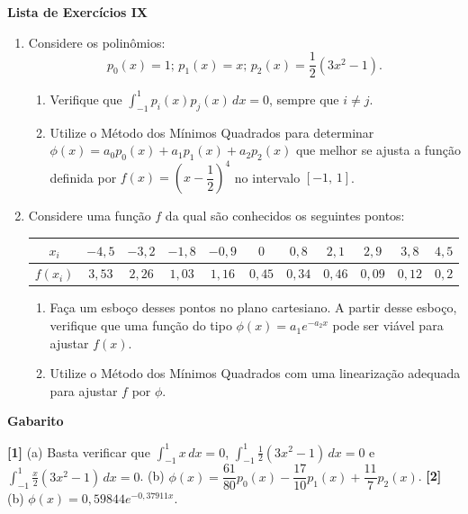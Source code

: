 \documentclass[12pt,a4paper]{article}
\begin{document}
\begin{center}
 \textbf{Lista de Exercícios IX}
\end{center}

\begin{enumerate}
  
  \item Considere os polinômios:
$$p_0(x) = 1;\, p_1(x) = x;\,p_2(x) = \frac{1}{2}(3x^2 - 1).$$


   \begin{enumerate}
    \item Verifique que $\displaystyle\int_{-1}^1 p_i(x)p_j(x)\,dx = 0$, sempre que $i\neq j$.
    \item Utilize o Método dos Mínimos Quadrados para determinar $\phi(x) = a_0p_0(x) + a_1p_1(x) + a_2p_2(x)$ que melhor se ajusta a função definida por 
          $f(x) = \left(x - \dfrac{1}{2}\right)^4$ no intervalo $[-1,\, 1]$.
   \end{enumerate}


  \item Considere uma função $f$ da qual são conhecidos os seguintes pontos:

   \begin{center}
   \begin{tabular}{c|c|c|c|c|c|c|c|c|c|c}
      $x_i$ & $-4,5$ & $-3,2$ & $-1,8$ & $-0,9$ & $0$ & $0,8$ & $2,1$ & $2,9$ & $3,8$ & $4,5$\\ \hline
      $f(x_i)$ & $3,53$ & $2,26$ & $1,03$ & $1,16$ & $0,45$ & $0,34$ & $0,46$ & $0,09$ & $0,12$ & $0,2$
   \end{tabular}
   \end{center}

   \begin{enumerate}
    \item Faça um esboço desses pontos no plano cartesiano. A partir desse esboço, verifique que uma função do tipo $\phi(x) = a_1e^{-a_2x}$ pode ser 
viável para ajustar $f(x)$.
    \item Utilize o Método dos Mínimos Quadrados com uma linearização adequada para ajustar $f$ por $\phi$.
   \end{enumerate}
  
\end{enumerate}

\begin{center}
\textbf{Gabarito}
\end{center} 
\textbf{[1]} (a) Basta verificar que $\displaystyle\int_{-1}^1 x\,dx=0$, $\displaystyle\int_{-1}^1 \frac{1}{2}(3x^2 - 1)\,dx=0$ e 
$\displaystyle\int_{-1}^1 \frac{x}{2}(3x^2 - 1)\,dx=0$. (b) $\phi(x) = \dfrac{61}{80}p_0(x) - \dfrac{17}{10}p_1(x) + \dfrac{11}{7}p_2(x)$. 
\textbf{[2]} (b) $\phi(x) = 0,59844e^{-0,37911x}$.
\end{document}
